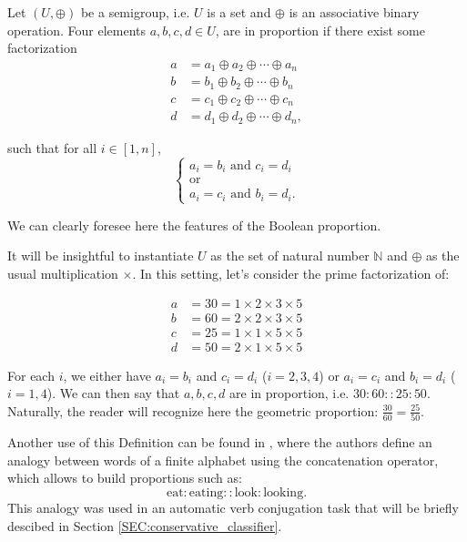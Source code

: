 \begin{definition}
\label{DEF:proportion_semi_group}
Let $(U, \oplus)$ be a semigroup, i.e. $U$ is a set and $\oplus$ is an
  associative binary operation. Four elements $a, b, c, d \in U$, are in proportion if
  there exist some factorization
  \begin{align*}
    a &= a_1 \oplus a_2 \oplus \cdots \oplus a_n\\
    b &= b_1 \oplus b_2 \oplus \cdots \oplus b_n\\
    c &= c_1 \oplus c_2 \oplus \cdots \oplus c_n\\
    d &= d_1 \oplus d_2 \oplus \cdots \oplus d_n,
  \end{align*}

  such that for all $i \in [1, n]$, 
  $$
  \begin{cases}
    a_i = b_i \text{ and } c_i = d_i\\
    \text{or}\\
    a_i = c_i \text{ and } b_i = d_i.
  \end{cases}
  $$
\end{definition}

\noindent
We can clearly foresee here the features of the Boolean proportion.

\begin{testexample}
It will be
insightful to instantiate $U$ as the set of natural number $\mathbb{N}$ and
$\oplus$ as the usual multiplication $\times$. In this setting, let's consider
the prime factorization of:

\begin{align*}
  a &= 30 = 1 \times 2 \times 3 \times 5\\
  b &= 60 = 2 \times 2 \times 3 \times 5\\
  c &= 25 = 1 \times 1 \times 5 \times 5\\
  d &= 50 = 2 \times 1 \times 5 \times 5
\end{align*}

For each $i$, we either have $a_i = b_i$ and $c_i = d_i$ ($i = 2, 3, 4$) or
$a_i = c_i$ and $b_i = d_i$ ($i = 1, 4$). We can then say that $a, b, c, d$ are
in proportion, i.e. $30: 60 :: 25:50$. Naturally, the reader will recognize
here the geometric proportion: $\frac{30}{60} = \frac{25}{50}$.
\end{testexample}

\begin{testexample}
  Another use of this Definition can be found in \cite{StrYvoREPORT05}, where
  the authors define an analogy between words of a finite alphabet using the
  concatenation operator, which allows to build proportions such as:
  $$\text{eat} : \text{eating} :: \text{look} : \text{looking}.$$ This analogy
  was used in an automatic verb conjugation task that will be briefly descibed
  in Section \ref{SEC:conservative_classifier}.
\end{testexample}


